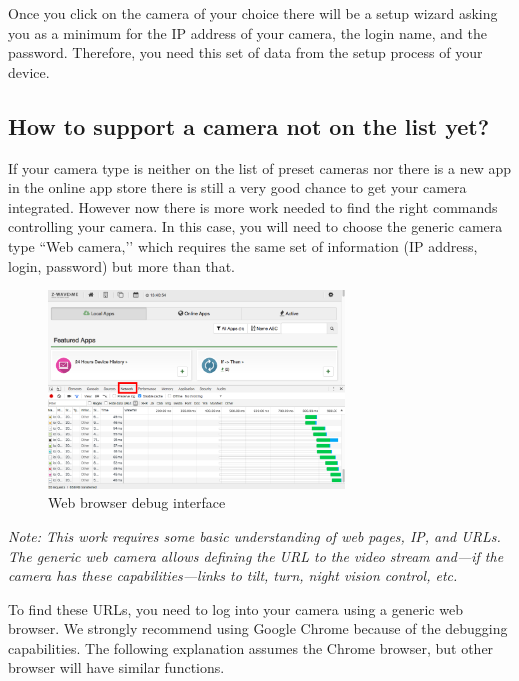 Once you click on the camera of your choice there will be a setup wizard asking you as a 
minimum for the IP address of your camera, the login name, and the password. Therefore, 
you need this set of data from the setup process of your device.

\subsection{How to support a camera not on the list yet?}

If your camera type is neither on the list of preset cameras nor there is a new app in 
the online app store there is still a very good chance to get your camera integrated. 
However now there is more work needed to find the right commands controlling your camera. 
In this case, you will need to choose the generic camera type ``Web camera,’’ which requires 
the same set of information (IP address, login, password) but more than that.

\begin{figure}
\begin{center}
\includegraphics[width=0.7\textwidth]{pngs/cap9/camera4.png}
\caption{Web browser debug interface}
\label{camera4}
\end{center}
\end{figure}

{\em Note: This work requires some basic understanding of web pages, IP, and URLs. The 
generic web camera allows defining the URL to the video stream and---if the camera has 
these capabilities---links to tilt, turn, night vision control, etc.}

To find these URLs, you need to log into your camera using a generic web browser. We 
strongly recommend using Google Chrome because of the debugging capabilities. The 
following explanation assumes the Chrome browser, but other browser will have similar functions.

